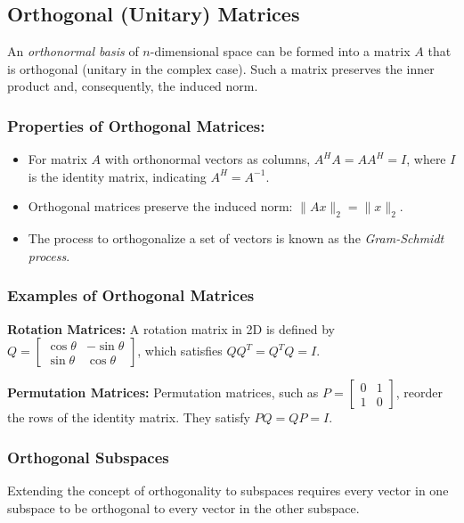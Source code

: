 \subsection{Orthogonal (Unitary) Matrices}

An \textit{orthonormal basis} of \( n \)-dimensional space can be formed into a matrix \( A \) that is orthogonal (unitary in the complex case). Such a matrix preserves the inner product and, consequently, the induced norm.

\subsubsection*{Properties of Orthogonal Matrices:}
\begin{itemize}
    \item For matrix \( A \) with orthonormal vectors as columns, \( A^HA = AA^H = I \), where \( I \) is the identity matrix, indicating \( A^H = A^{-1} \).
    \item Orthogonal matrices preserve the induced norm: \( \|Ax\|_2 = \|x\|_2 \).
    \item The process to orthogonalize a set of vectors is known as the \textit{Gram-Schmidt process}.
\end{itemize}

\subsubsection*{Examples of Orthogonal Matrices}

\textbf{Rotation Matrices:}
A rotation matrix in 2D is defined by \( Q = \begin{bmatrix} \cos \theta & -\sin \theta \\ \sin \theta & \cos \theta \end{bmatrix} \), which satisfies \( QQ^T = Q^TQ = I \).

\textbf{Permutation Matrices:}
Permutation matrices, such as \( P = \begin{bmatrix} 0 & 1 \\ 1 & 0 \end{bmatrix} \), reorder the rows of the identity matrix. They satisfy \( PQ = QP = I \).

\subsubsection*{Orthogonal Subspaces}

Extending the concept of orthogonality to subspaces requires every vector in one subspace to be orthogonal to every vector in the other subspace.

